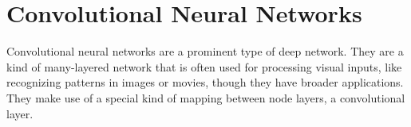 \chapter{Convolutional Neural Networks}\label{ch_cnn}



Convolutional neural networks are a prominent type of deep network. They are a kind of many-layered network that is often used for processing visual inputs, like recognizing patterns in images or movies, though they have broader applications. They make use of a special kind of mapping between node layers, a convolutional layer. 

